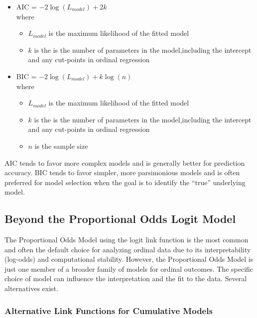 \documentclass[
  letterpaper,
  DIV=11,
  numbers=noendperiod]{scrartcl}
\providecommand{\tightlist}{%
  \setlength{\itemsep}{0pt}\setlength{\parskip}{0pt}}\usepackage{longtable,booktabs,array}
\begin{document}
\begin{itemize}
\tightlist
\item
  AIC = \(-2 \log(L_{model})+2k\)\\
  where

  \begin{itemize}
  \tightlist
  \item
    \(L_{model}\) is the maximum likelihood of the fitted model
  \item
    \(k\) is the is the number of parameters in the model,including the
    intercept and any cut-points in ordinal regression
  \end{itemize}
\item
  BIC = \(-2 \log(L_{model})+k\log(n)\)\\
  where

  \begin{itemize}
  \tightlist
  \item
    \(L_{model}\) is the maximum likelihood of the fitted model
  \item
    \(k\) is the is the number of parameters in the model,including the
    intercept and any cut-points in ordinal regression
  \item
    \(n\) is the sample size
  \end{itemize}
\end{itemize}

AIC tends to favor more complex models and is generally better for
prediction accuracy. BIC tends to favor simpler, more parsimonious
models and is often preferred for model selection when the goal is to
identify the ``true'' underlying model.

\hypertarget{beyond-the-proportional-odds-logit-model}{%
\subsection{Beyond the Proportional Odds Logit
Model}\label{beyond-the-proportional-odds-logit-model}}

The Proportional Odds Model using the logit link function is the most
common and often the default choice for analyzing ordinal data due to
its interpretability (log-odds) and computational stability. However,
the Proportional Odds Model is just one member of a broader family of
models for ordinal outcomes. The specific choice of model can influence
the interpretation and the fit to the data. Several alternatives exist.

\hypertarget{alternative-link-functions-for-cumulative-models}{%
\subsubsection{Alternative Link Functions for Cumulative
Models}\label{alternative-link-functions-for-cumulative-models}}
\end{document}
